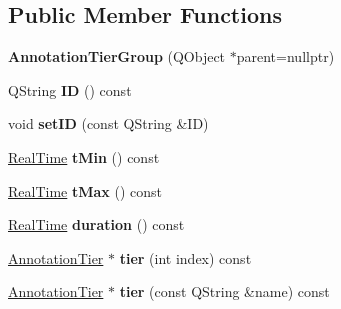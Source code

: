\subsection*{Public Member Functions}
\begin{DoxyCompactItemize}
\item 
\mbox{\label{class_annotation_tier_group_a1f9216569e4472d42a03d56d1d8d85ab}} 
{\bfseries Annotation\+Tier\+Group} (Q\+Object $\ast$parent=nullptr)
\item 
\mbox{\label{class_annotation_tier_group_ab15b7541e671ee5b689d2b0439c34813}} 
Q\+String {\bfseries ID} () const
\item 
\mbox{\label{class_annotation_tier_group_af35d66ef4ee1f95f8717f6d092b16450}} 
void {\bfseries set\+ID} (const Q\+String \&ID)
\item 
\mbox{\label{class_annotation_tier_group_a0ddaad6d5fc3842284eef55e44a3f278}} 
\hyperlink{struct_real_time}{Real\+Time} {\bfseries t\+Min} () const
\item 
\mbox{\label{class_annotation_tier_group_ac3c30ab4c2b06825b50e97f14138db8c}} 
\hyperlink{struct_real_time}{Real\+Time} {\bfseries t\+Max} () const
\item 
\mbox{\label{class_annotation_tier_group_a88a5b0eda8ff9043c45ad27b0e10f848}} 
\hyperlink{struct_real_time}{Real\+Time} {\bfseries duration} () const
\item 
\mbox{\label{class_annotation_tier_group_a7ecc7a86af2df4a514718680eac1630d}} 
\hyperlink{class_annotation_tier}{Annotation\+Tier} $\ast$ {\bfseries tier} (int index) const
\item 
\mbox{\label{class_annotation_tier_group_a61f8204c07bb2b214ad5f3858b974bba}} 
\hyperlink{class_annotation_tier}{Annotation\+Tier} $\ast$ {\bfseries tier} (const Q\+String \&name) const
\item 
\mbox{\label{class_annotation_tier_group_a84bd7ee636bc58b353f8557f89910a43}} 

\end{DoxyCompactItemize}
